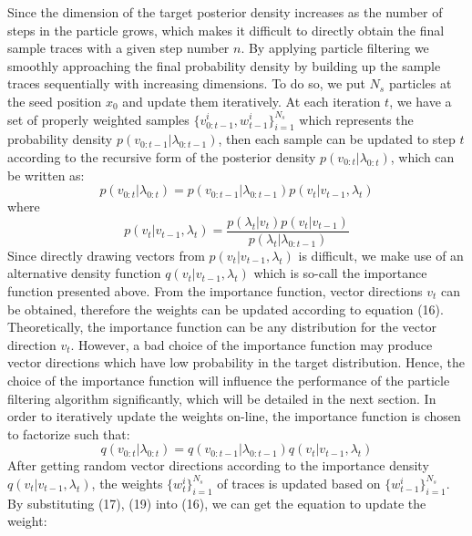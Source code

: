 Since the dimension of the target posterior density increases as the number of steps in the particle grows, which makes it difficult to directly obtain the final sample traces with a given step number $n$. By applying particle filtering we smoothly approaching the final probability density by building up the sample traces sequentially with increasing dimensions. To do so, we put ${N_s}$ particles at the seed position $x_0$ and update them iteratively. At each iteration $t$, we have a set of properly weighted samples $\{ v_{0:t-1}^i,w_{t-1}^i\} _{i = 1}^{{N_s}}$ which represents the probability density $p({v_{0:t-1}}|{\lambda_{0:t-1}})$, then each sample can be updated to step $t$ according to the recursive form of the posterior density $p({v_{0:t}}|{\lambda_{0:t}})$, which can be written as:
\begin{equation}
  p({v_{0:t}}|{\lambda_{0:t}}) = p({v_{0:t - 1}}|{\lambda_{0:t - 1}})p(v_t|v_{t-1},\lambda_t)
\end{equation}
where
\begin{equation}
  p(v_t|v_{t-1},\lambda_t) = \frac{{p({\lambda_t}|{v_t})p({v_t}|{v_{t - 1}})}}{{p({\lambda_t}|{\lambda_{0:t - 1}})}}
\end{equation}
Since directly drawing vectors from $p(v_t|v_{t-1},\lambda_t)$ is difficult, we make use of an alternative density function $q({v_t}|{v_{t - 1}},{\lambda_t})$ which is so-call the importance function presented above. From the importance function, vector directions $v_t$ can be obtained, therefore the weights can be updated according to equation (16). Theoretically, the importance function can be any distribution for the vector direction $v_t$. However, a bad choice of the importance function may produce vector directions which have low probability in the target distribution. Hence, the choice of the importance function will influence the performance of the particle filtering algorithm significantly, which will be detailed in the next section. In order to iteratively update the weights on-line, the importance function is chosen to factorize such that:
\begin{equation}
  q({v_{0:t}}|{\lambda_{0:t}}) = q({v_{0:t - 1}}|{\lambda_{0:t - 1}})q({v_t}|{v_{t - 1}},{\lambda_t})
\end{equation}
After getting random vector directions according to the importance density $q({v_t}|{v_{t - 1}},{\lambda_t})$, the weights $\{w_t^i\} _{i = 1}^{{N_s}}$ of traces is updated based on $\{w_{t-1}^i\} _{i = 1}^{{N_s}}$. By substituting (17), (19) into (16), we can get the equation to update the weight:
